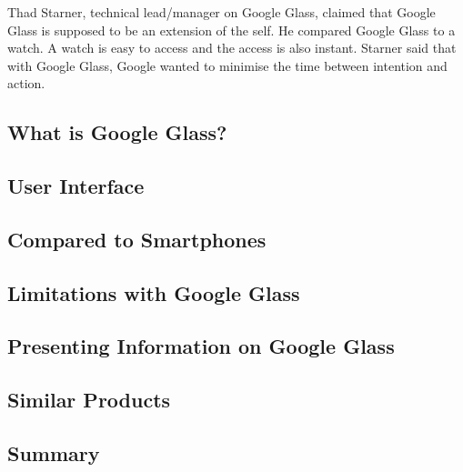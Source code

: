 Thad Starner, technical lead/manager on Google Glass, claimed that Google Glass is supposed to be an extension of the self.\cite{6504855} He compared Google Glass to a watch. A watch is easy to access and the access is also instant. Starner said that with Google Glass, Google wanted to minimise the time between intention and action. 


\subsection{What is Google Glass?}
\label{subsec:googleglass}


\subsection{User Interface}
\label{subsec:userinterface}


\subsection{Compared to Smartphones}
\label{comparedtophones}


\subsection{Limitations with Google Glass}
\label{subsec:limitations}


\subsection{Presenting Information on Google Glass}
\label{subsec:informationlimitedspace}


\subsection{Similar Products}
\label{subsec:similarproducts}


\subsection{Summary}
\label{subsec:summary}











